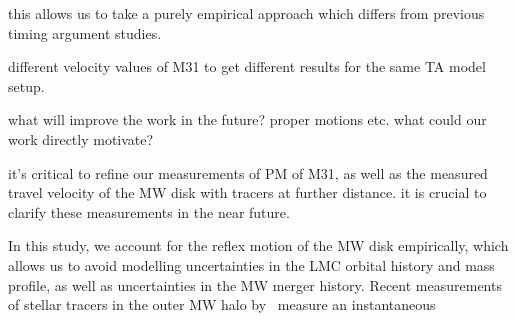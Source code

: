 \documentclass[twocolumn]{aastex631}
\begin{document}
this allows us to take a purely empirical approach which differs from previous timing argument studies. 

different velocity values of M31 to get different results for the same TA model setup. 


what will improve the work in the future? proper motions etc. what could our work directly motivate? 




it's critical to refine our measurements of PM of M31, as well as the measured travel velocity of the MW disk with tracers at further distance. it is crucial to clarify these measurements in the near future.


In this study, we account for the reflex motion of the MW disk 
empirically, which allows us to avoid modelling uncertainties in the LMC orbital 
history and mass profile, as well as uncertainties in the MW merger history.
Recent measurements of stellar tracers in the outer MW halo 
by~\cite{Petersen2021} measure an instantaneous 
\end{document}
